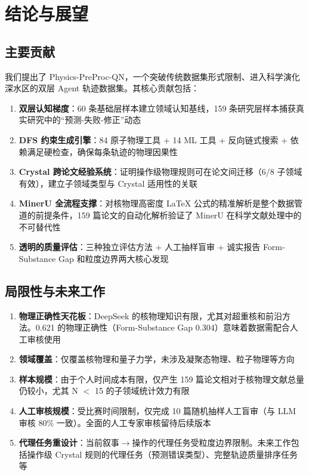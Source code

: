 \documentclass[12pt,a4paper]{article}
\begin{document}
\section{结论与展望}

\subsection{主要贡献}

我们提出了 Physics-PreProc-QN，一个突破传统数据集形式限制、进入科学演化深水区的双层 Agent 轨迹数据集。其核心贡献包括：

\begin{enumerate}
\item \textbf{双层认知梯度}：60 条基础层样本建立领域认知基线，159 条研究层样本捕获真实研究中的“预测-失败-修正”动态
\item \textbf{DFS 约束生成引擎}：84 原子物理工具 + 14 ML 工具 + 反向链式搜索 + 依赖满足硬检查，确保每条轨迹的物理因果性
\item \textbf{Crystal 跨论文经验系统}：证明操作级物理规则可在论文间迁移（6/8 子领域有效），建立子领域类型与 Crystal 适用性的关联
\item \textbf{MinerU 全流程支撑}：对核物理高密度 LaTeX 公式的精准解析是整个数据管道的前提条件，159 篇论文的自动化解析验证了 MinerU 在科学文献处理中的不可替代性
\item \textbf{透明的质量评估}：三种独立评估方法 + 人工抽样盲审 + 诚实报告 Form-Substance Gap 和粒度边界两大核心发现
\end{enumerate}

\subsection{局限性与未来工作}

\begin{enumerate}
\item \textbf{物理正确性天花板}：DeepSeek 的核物理知识有限，尤其对超重核和前沿方法。0.621 的物理正确性（Form-Substance Gap 0.304）意味着数据需配合人工审核使用
\item \textbf{领域覆盖}：仅覆盖核物理和量子力学，未涉及凝聚态物理、粒子物理等方向
\item \textbf{样本规模}：由于个人时间成本有限，仅产生 159 篇论文相对于核物理文献总量仍较小，尤其 N $<$ 15 的子领域统计效力有限
\item \textbf{人工审核规模}：受比赛时间限制，仅完成 10 篇随机抽样人工盲审（与 LLM 审核 80\% 一致）。全面的人工专家审核留待后续版本
\item \textbf{代理任务重设计}：当前叙事$\rightarrow$操作的代理任务受粒度边界限制。未来工作包括操作级 Crystal 规则的代理任务（预测错误类型）、完整轨迹质量排序任务等

\end{enumerate}
\end{document}
